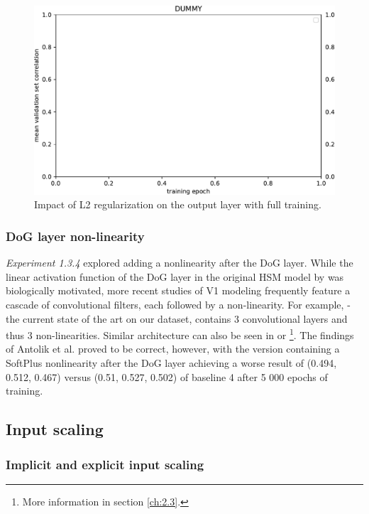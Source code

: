 \begin{figure}[H]
    \centering
    \includegraphics[width=1\textwidth]{../figures/05_dummy}
    \caption[Experiment 1.3.3]{Impact of L2 regularization on the output layer with full training.}
    \label{fig:5.1.3.3}
\end{figure}

\subsubsection{DoG layer non-linearity}\label{ex:1.3.4}

\textit{Experiment 1.3.4} explored adding a nonlinearity after the DoG layer. While the linear activation function of the DoG layer in the original HSM model by \cite{antolik} was biologically motivated, more recent studies of V1 modeling frequently feature a cascade of convolutional filters, each followed by a non-linearity. For example, \cite{klidnt} - the current state of the art on our dataset, contains 3 convolutional layers and thus 3 non-linearities. Similar architecture can also be seen in \cite{ecker} or \cite{Walke506956}\footnote{More information in section \ref{ch:2.3}.}. The findings of Antolik et al. proved to be correct, however, with the version containing a SoftPlus nonlinearity after the DoG layer achieving a worse result of (0.494, 0.512, 0.467) versus (0.51, 0.527, 0.502) of baseline 4 after 5 000 epochs of training.

\subsection{Input scaling}
\subsubsection{Implicit and explicit input scaling}

